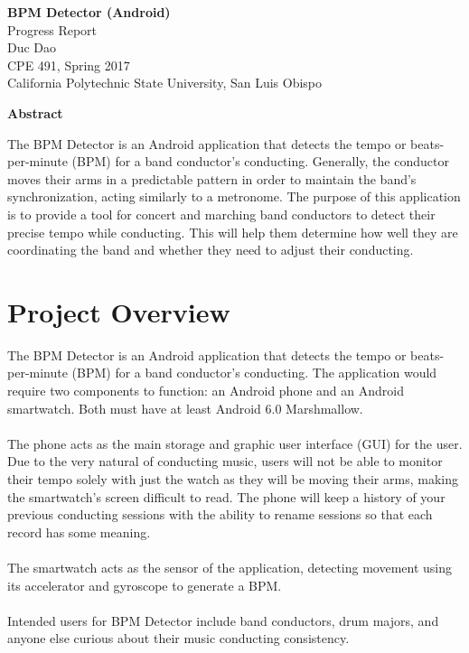 \documentclass[12pt]{article}
\begin{document}
\begin{center}
  \vspace*{1in}
  \textbf{\LARGE{BPM Detector (Android)}} \\
  \large{Progress Report \\
  Duc Dao \\
  CPE 491, Spring 2017 \\
  California Polytechnic State University, San Luis Obispo} \\
\end{center}

\begin{center}
  \vspace*{2in}
  \textbf{Abstract} \\
\end{center}
The BPM Detector is an Android application that detects the tempo or beats-per-minute (BPM) for a band conductor's conducting. Generally, the conductor moves their arms in a predictable pattern in order to maintain the band's synchronization, acting similarly to a metronome. The purpose of this application is to provide a tool for concert and marching band conductors to detect their precise tempo while conducting. This will help them determine how well they are coordinating the band and whether they need to adjust their conducting.  

\newpage

\tableofcontents

\newpage

\section{Project Overview}

The BPM Detector is an Android application that detects the tempo or beats-per-minute (BPM) for a band conductor's conducting. The application would require two components to function: an Android phone and an Android smartwatch. Both must have at least Android 6.0 Marshmallow.
\\
\\
The phone acts as the main storage and graphic user interface (GUI) for the user. Due to the very natural of conducting music, users will not be able to monitor their tempo solely with just the watch as they will be moving their arms, making the smartwatch's screen difficult to read. The phone will keep a history of your previous conducting sessions with the ability to rename sessions so that each record has some meaning.
\\
\\
The smartwatch acts as the sensor of the application, detecting movement using its accelerator and gyroscope to generate a BPM.
\\
\\
Intended users for BPM Detector include band conductors, drum majors, and anyone else curious about their music conducting consistency.
\end{document}
